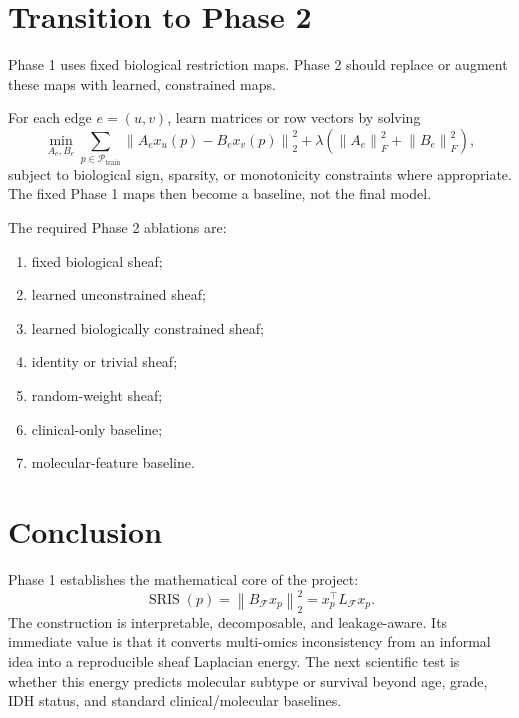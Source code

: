 \documentclass[11pt]{article}
\newcommand{\BF}{B_{\mathcal{F}}}
\newcommand{\LF}{L_{\mathcal{F}}}
\newcommand{\SRIS}{\operatorname{SRIS}}
\newcommand{\norm}[1]{\left\lVert #1 \right\rVert}
\begin{document}
\section{Transition to Phase 2}

Phase 1 uses fixed biological restriction maps.  Phase 2 should replace or augment these maps with learned, constrained maps.

For each edge $e=(u,v)$, learn matrices or row vectors by solving
\[
\min_{A_e,B_e}
\sum_{p\in\mathcal{P}_{\mathrm{train}}}
\norm{A_e x_u(p)-B_e x_v(p)}_2^2
+
\lambda\left(\norm{A_e}_F^2+\norm{B_e}_F^2\right),
\]
subject to biological sign, sparsity, or monotonicity constraints where appropriate.  The fixed Phase 1 maps then become a baseline, not the final model.

The required Phase 2 ablations are:
\begin{enumerate}[leftmargin=1.2cm]
    \item fixed biological sheaf;
    \item learned unconstrained sheaf;
    \item learned biologically constrained sheaf;
    \item identity or trivial sheaf;
    \item random-weight sheaf;
    \item clinical-only baseline;
    \item molecular-feature baseline.
\end{enumerate}

\section{Conclusion}

Phase 1 establishes the mathematical core of the project:
\[
\boxed{\SRIS(p)=\norm{\BF x_p}_2^2=x_p^\top\LF x_p.}
\]
The construction is interpretable, decomposable, and leakage-aware.  Its immediate value is that it converts multi-omics inconsistency from an informal idea into a reproducible sheaf Laplacian energy.  The next scientific test is whether this energy predicts molecular subtype or survival beyond age, grade, IDH status, and standard clinical/molecular baselines.
\end{document}
